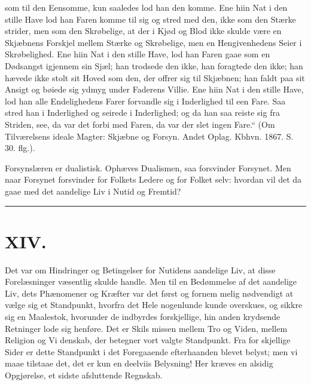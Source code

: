 \documentclass[12pt]{book}
\newcommand{\opage}[1]{\marginnote{\footnotesize\textit{[#1]}}}
\begin{document}
som til den Eensomme, kun saaledes lod han den komme.
Ene hiin Nat i den stille Have lod han Faren komme
til sig og stred med den, ikke som den Stærke strider,
men som den Skrøbelige, at der i Kjød og Blod ikke
skulde være en Skjæbnens Forskjel mellem Stærke og
Skrøbelige, men en Hengivenhedens Seier i Skrøbelighed.
Ene hiin Nat i den stille Have, lod han Faren gaae som
en Dødsangst igjennem sin Sjæl; han trodsede den ikke,
han foragtede den ikke; han hævede ikke stolt sit Hoved
som den, der offrer sig til Skjæbnen; han faldt paa sit
\opage{224}\setcounter{footnote}{0}%
Ansigt og bøiede sig ydmyg under Faderens Villie. Ene
hiin Nat i den stille Have, lod han alle Endelighedens
Farer forvandle sig i Inderlighed til een Fare. Saa stred
han i Inderlighed og seirede i Inderlighed; og da han
saa reiste sig fra Striden, see, da var det forbi med
Faren, da var der slet ingen Fare.“ (Om Tilværelsens
ideale Magter: Skjæbne og Forsyn. Andet Oplag. Kbhvn.
1867. S. 30. flg.).

Forsynslæren er dualistisk. Ophæves Dualismen,
saa forsvinder Forsynet. Men naar Forsynet forsvinder
for Folkets Ledere og for Folket selv: hvordan vil det
da gaae med det aandelige Liv i Nutid og Fremtid?

\begin{center}\rule{3cm}{0.4pt}\end{center}

\chapter*{XIV.}
\label{ch:xiv}
\opage{225}\setcounter{footnote}{0}%
Det var om Hindringer og Betingelser for Nutidens
aandelige Liv, at disse Forelæsninger væsentlig skulde
handle. Men til en Bedømmelse af det aandelige Liv,
dets Phænomener og Kræfter var det først og fornem\-%
melig nødvendigt at vælge sig et Standpunkt, hvorfra det
Hele nogenlunde kunde overskues, og sikkre sig en
Maalestok, hvorunder de indbyrdes forskjellige, hin\-%
anden krydsende Retninger lode sig henføre. Det er Skils\-%
missen mellem Tro og Viden, mellem Religion og Vi\-%
denskab, der betegner vort valgte Standpunkt. Fra for\-%
skjellige Sider er dette Standpunkt i det Foregaaende
efterhaanden blevet belyst; men vi maae tilstaae det, det
er kun en deelviis Belysning! Her kræves en alsidig
Opgjørelse, et sidste afsluttende Regnskab.
\end{document}
